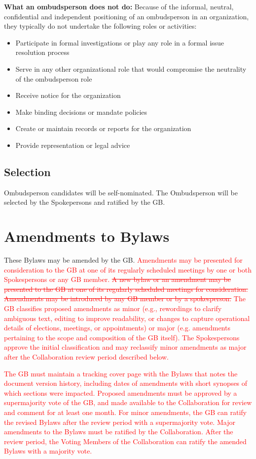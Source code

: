 \documentclass[12pt]{article}
\begin{document}
{\bf What an ombudsperson does not do:} Because of the informal, neutral, confidential and independent positioning of an ombudsperson
in an organization, they typically do not undertake the following roles or activities:
\begin{itemize}
\item Participate in formal investigations or play any role in a formal issue resolution process
\item Serve in any other organizational role that would compromise the neutrality of the
ombudsperson role
\item Receive notice for the organization
\item Make binding decisions or mandate policies
\item Create or maintain records or reports for the organization
\item Provide representation or legal advice

\end{itemize}

\subsection{Selection}
Ombudsperson candidates will be self-nominated.  The Ombudsperson will be selected by the Spokepersons and ratified by the GB.


\section{Amendments to Bylaws}
\label{sec:amend}
These Bylaws may be amended by the GB. \textcolor{red} {Amendments may be presented for consideration to the GB at one of its regularly scheduled meetings by one or both Spokespersons or any GB member.
\sout{A new bylaw or an amendment may be presented to the GB at one of its regularly scheduled meetings for consideration. Amendments may be introduced by any GB member or by a spokesperson.}
The GB  classifies proposed amendments as minor (e.g., rewordings to clarify ambiguous text, editing to improve readability, or changes to capture operational details of elections, meetings, or appointments) or major (e.g. amendments pertaining to the scope and composition of the GB itself).  The Spokespersons approve the initial classification and may reclassify minor amendments as major after the Collaboration review period described below.}

\textcolor{red}{
The GB must  maintain a tracking cover page with the Bylaws that notes the document version history, including dates of amendments with short synopses of which sections were impacted.  Proposed amendments must be approved by a supermajority vote of the GB, and made available to the Collaboration for review and comment for at least one month.  
For minor amendments, the GB can  ratify the revised Bylaws after the review period with a supermajority vote. Major amendments to the Bylaws must be ratified by the Collaboration. After the review period, the Voting Members of the Collaboration can  ratify the amended Bylaws with a majority vote. }
\end{document}
